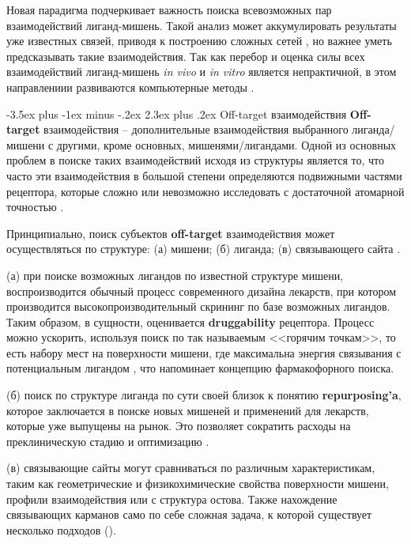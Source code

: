 \documentclass[a4paper,14pt]{extreport}
\makeatletter
\renewcommand{\section}{\@startsection{section}{1}{0pt}%
	{-3.5ex plus -1ex minus -.2ex}%
	{2.3ex plus .2ex}%
	{\centering\hyphenpenalty=10000\normalfont\Large\bfseries}}
\makeatother
\begin{document}
	Новая парадигма подчеркивает важность поиска всевозможных пар взаимодействий лиганд-мишень. Такой анализ может аккумулировать результаты уже известных связей, приводя к построению сложных сетей \cite{Anighoro2014}, но важнее уметь предсказывать такие взаимодействия. Так как перебор и оценка силы всех взаимодействий лиганд-мишень \textit{in vivo} и \textit{in vitro} является непрактичной, в этом направлениии развиваются компьютерные методы \cite{Chaudhari}.
	
	\section{Off-target взаимодействия}
	\textbf{Off-target} взаимодействия -- дополнительные взаимодействия выбранного лиганда/мишени с другими, кроме основных,  мишенями/лигандами. Одной из основных проблем в поиске таких взаимодействий исходя из структуры является то, что часто эти взаимодействия в большой степени определяются подвижными частями рецептора, которые сложно или невозможно исследовать с достаточной атомарной точностью \cite{Loving}.
	
	Принципиально, поиск субъектов \textbf{off-target} взаимодействия может осуществляться по структуре: (а) мишени; (б) лиганда; (в) связывающего сайта \cite{Rognan2010}.
	
	(а) при поиске возможных лигандов по известной структуре мишени, воспроизводится обычный процесс современного дизайна лекарств, при котором производится высокопроизводительный скрининг по базе возможных лигандов. Таким образом, в сущности, оценивается \textbf{druggability} рецептора. Процесс можно ускорить, используя поиск по так называемым <<горячим точкам>>, то есть набору мест на поверхности мишени, где максимальна энергия связывания с потенциальным лигандом \cite{Hall2015}, что напоминает концепцию фармакофорного поиска.
	 
	(б) поиск по структуре лиганда по сути своей близок к понятию \textbf{repurposing'a}, которое заключается в поиске новых мишеней и применений для лекарств, которые уже выпущены на рынок. Это позволяет сократить расходы на преклиническую стадию и оптимизацию \cite{March-Vila2017}. 
	\cite{Hall2015}
	
	
	(в) связывающие сайты могут сравниваться по различным характеристикам, таким как геометрические и физикохимические свойства поверхности мишени, профили взаимодействия или с структура остова. Также нахождение связывающих карманов само по себе сложная задача, к которой существует несколько подходов ()\cite{Ehrt2016}. 
	
\end{document}
